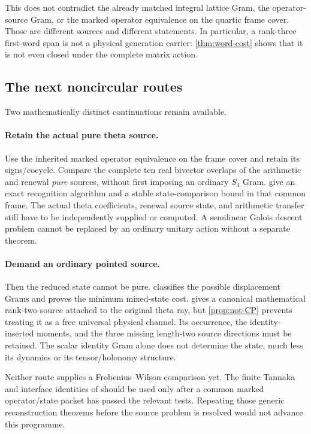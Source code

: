 \documentclass[11pt]{article}
\theoremstyle{definition}
\theoremstyle{remark}
\begin{document}
This does not contradict the already matched integral lattice Gram, the
operator-source Gram, or the marked operator equivalence on the quartic
frame cover. Those are different sources and different statements. In
particular, a rank-three first-word span is not a physical generation
carrier: \cref{thm:word-cost} shows that it is not even closed under the
complete matrix action.

\subsection{The next noncircular routes}
Two mathematically distinct continuations remain available.

\paragraph{Retain the actual pure theta source.}
Use the inherited marked operator equivalence on the frame cover and retain
its signs/cocycle. Compare the complete ten real bivector overlaps of the
arithmetic and renewal \emph{pure} sources, without first imposing an ordinary
$S_4$ Gram.  give an exact
recognition algorithm and a stable state-comparison bound in that common
frame. The actual theta coefficients, renewal source state, and arithmetic
transfer still have to be independently supplied or computed. A semilinear
Galois descent problem cannot be replaced by an ordinary unitary action
without a separate theorem.

\paragraph{Demand an ordinary pointed source.}
Then the reduced state cannot be pure. 
classifies the possible displacement Grams and proves the minimum mixed-state
cost.  gives a canonical mathematical rank-two source
attached to the original theta ray, but \cref{prop:not-CP} prevents treating
it as a free universal physical channel. Its occurrence, the
identity-inserted moments, and the three missing length-two source directions
must be retained. The scalar identity Gram alone does not determine the
state, much less its dynamics or its tensor/holonomy structure.

Neither route supplies a Frobenius--Wilson comparison yet. The finite
Tannaka and interface identities of \cite{GT77} should be used only after a
common marked operator/state packet has passed the relevant tests. Repeating
those generic reconstruction theorems before the source problem is resolved
would not advance this programme.
\end{document}
